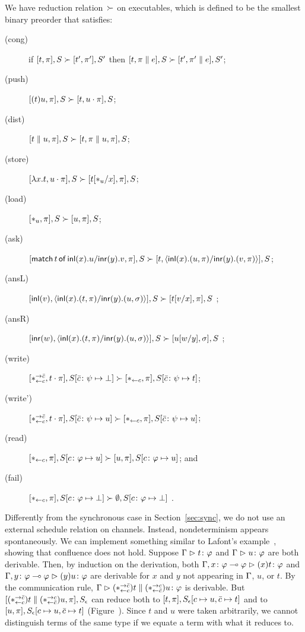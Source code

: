 We have reduction relation~$\succ$ on executables,
which is defined to be the smallest binary preorder
that satisfies:
\begin{description}
 \item[(cong)] if
	    $[t,\pi],         S \succ [ t',\pi'],        S'$
	    then
	    $[t,\pi \parallel e], S \succ [ t',\pi'\parallel e], S'$\enspace;
 \item[(push)]
	    $[(t)u,\pi],S       \succ [t,u\cdot\pi],S$;
 \item[(dist)]
	    $[t\parallel u,\pi],S   \succ [t,\pi\parallel u,\pi],S$\enspace;
 \item[(store)]
	    $[\lambda x.t,u\cdot\pi],S
	     \succ
	     [t[\ast_u/x],      \pi],S$\enspace;
 \item[(load)]
	    $[\ast_u,\pi],S\succ[u,\pi],S$\enspace;
 \item[(ask)]
      $[\mathsf{match}\,{t}\,\mathsf{of}\, \mathsf{inl}({x}). {u}/ \mathsf{inr}({y}). {v},\pi], S\succ [t,\langle \mathsf{inl}({x}). ({u},{\pi})/ \mathsf{inr}({y}). ({v},{\pi})\rangle], S$\enspace;
 \item[(ansL)]
      $[\mathsf{inl}({v}), \langle \mathsf{inl}({x}). ({t},{\pi})/ \mathsf{inr}({y}). ({u},{\sigma})\rangle],S \succ [t[v/x],\pi],S $ \enspace;
 \item[(ansR)]
      $[\mathsf{inr}({w}), \langle \mathsf{inl}({x}). ({t},{\pi})/ \mathsf{inr}({y}). ({u},{\sigma})\rangle],S \succ [u[w/y],\sigma],S $ \enspace;
 \item[(write)]
	    $
	    [\ast^{\rightarrow {\bar{c}}}_{\leftarrow{c}}, t\cdot\pi], S[\bar{c}\colon\psi\mapsto\bot]
	    \succ
	    [\ast_{\leftarrow{c}}, \pi],
	    S[\bar{c}\colon\psi\mapsto t]
	    $\enspace;
 \item[(write')]
	    $
	    [\ast^{\rightarrow {\bar{c}}}_{\leftarrow{c}}, t\cdot\pi], S[\bar{c}\colon\psi\mapsto u]
	    \succ
	    [\ast_{\leftarrow{c}}, \pi],
	    S[\bar{c}\colon\psi\mapsto u]
	    $\enspace;
 \item[(read)]$
	    [\ast_{\leftarrow{c}} ,\pi],
	    S[c\colon\varphi\mapsto u]
	    \succ
	    [u,\pi],
	    S[c\colon\varphi\mapsto u]
	    $\enspace; and
 \item[(fail)]
	    $
	    [\ast_{\leftarrow{c}},\pi],
	    S[c\colon\varphi\mapsto \bot]
	    \succ
	    \emptyset,S[c\colon\varphi\mapsto \bot]
	    $
	    \enspace.
\end{description}
Differently from the synchronous case in Section~\ref{sec:sync},
we do not use an external schedule relation on channels.
Instead, nondeterminism appears spontaneously.
We can implement something similar to Lafont's example~\citep[B.1]{girard1989proofs},
showing that confluence does not hold.
Suppose $\Gamma\vartriangleright{t} \colon{\varphi}$ and $\Gamma\vartriangleright{u} \colon{\varphi}$ are both derivable.
Then, by induction on the derivation,
both $\Gamma,{x} \colon{\varphi\multimap\varphi}\vartriangleright{(x)t} \colon{\varphi}$
and $\Gamma,{y} \colon{\varphi\multimap\varphi}\vartriangleright{(y)u} \colon{\varphi}$ are derivable
for $x$ and $y$ not appearing in $\Gamma$, $u$, or $t$.
By the communication rule,
$\Gamma\vartriangleright{(\ast^{\rightarrow {\bar{c}}}_{\leftarrow{c}})t\parallel(\ast^{\rightarrow {c}}_{\leftarrow{\bar{c}}})u} \colon{\varphi}$ is derivable.
But $[(\ast^{\rightarrow {\bar{c}}}_{\leftarrow{c}})t\parallel (\ast^{\rightarrow {c}}_{\leftarrow{\bar{c}}})u,
\pi],S_\epsilon$
can reduce both to $[t,\pi], S_\epsilon[c\mapsto u, \bar{c}\mapsto t]$
and to $[u,\pi], S_\epsilon[c\mapsto u,\bar{c}\mapsto t]$ (Figure~).
Since $t$ and $u$ were taken arbitrarily, we cannot distinguish terms
of the same type if we equate a term with what it reduces to.

